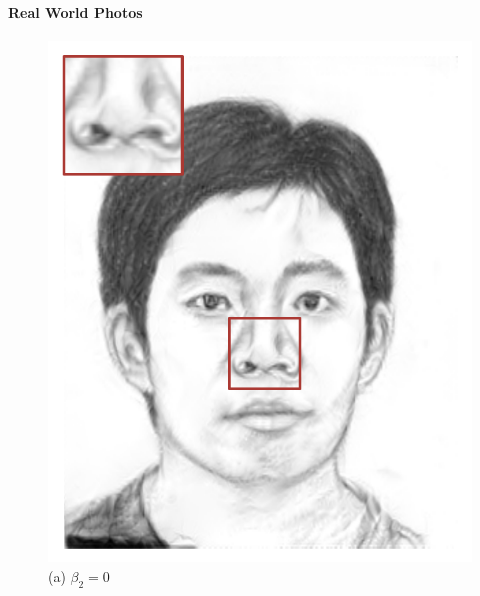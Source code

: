\documentclass[10pt,twocolumn,letterpaper]{article}
\begin{document}
\paragraph{Real World Photos}


\begin{figure}[htbp]
\centering
\begin{minipage}[t]{0.49\linewidth}
\centering
\includegraphics[width=0.99\linewidth]{img/effective_eval/wo_region.pdf}
(a) $\beta_2=0$
\end{minipage}
\begin{minipage}[t]{0.49\linewidth}

\end{minipage}
\end{figure}
\end{document}
